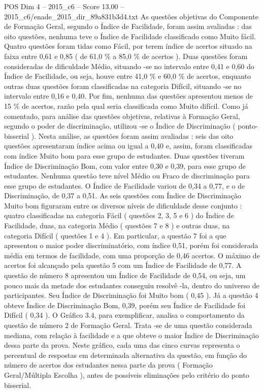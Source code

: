 \begin{textsample}{POS Dim 4 – 2015\_c6 – Score 13.00 – 2015\_c6/enade\_2015\_dir\_89a831b3d4.txt}
As questões objetivas do Componente de Formação Geral, segundo o Índice de Facilidade, foram assim avaliadas : das oito questões, nenhuma teve o Índice de Facilidade classificado como Muito fácil.
Quatro questões foram tidas como Fácil, por terem índice de acertos situado na faixa entre 0,61 e 0,85 ( de 61,0 \% a 85,0 \% de acertos ).
Duas questões foram consideradas de dificuldade Médio, situando -se no intervalo entre 0,41 e 0,60 do Índice de Facilidade, ou seja, houve entre 41,0 \% e 60,0 \% de acertos, enquanto outras duas questões foram classificadas na categoria Difícil, situando -se no intervalo entre 0,16 e 0,40.
Por fim, nenhuma das questões apresentou menos de 15 \% de acertos, razão pela qual seria classificada como Muito difícil.
Como já comentado, para análise das questões objetivas, relativas à Formação Geral, segundo o poder de discriminação, utilizou -se o Índice de Discriminação ( ponto- bisserial ).
Nesta análise, as questões foram assim avaliadas : seis das oito questões apresentaram índice acima ou igual a 0,40 e, assim, foram classificadas com índice Muito bom para esse grupo de estudantes.
Duas questões tiveram Índice de Discriminação Bom, com valor entre 0,30 e 0,39, para esse grupo de estudantes.
Nenhuma questão teve nível Médio ou Fraco de discriminação para esse grupo de estudantes.
O Índice de Facilidade variou de 0,34 a 0,77, e o de Discriminação, de 0,37 a 0,51.
As seis questões com Índice de Discriminação Muito bom figuraram entre os diversos níveis de dificuldade desse conjunto : quatro classificadas na categoria Fácil ( questões 2, 3, 5 e 6 ) do Índice de Facilidade, duas, na categoria Médio ( questões 7 e 8 ) e outras duas, na categoria Difícil ( questões 1 e 4 ).
Em particular, a questão 7 foi a que apresentou o maior poder discriminatório, com índice 0,51, porém foi considerada média em termos de facilidade, com uma proporção de 0,46 acertos.
O máximo de acertos foi alcançado pela questão 5 com um Índice de Facilidade de 0,77.
A questão de número 8 apresentou um Índice de Facilidade de 0,54, ou seja, um pouco mais da metade dos estudantes conseguiu resolvê -la, dentro do universo de participantes.
Seu Índice de Discriminação foi Muito bom ( 0,45 ).
Já a questão 4 obteve Índice de Discriminação Bom, 0,39, porém seu Índice de Facilidade foi Difícil ( 0,34 ).
O Gráfico 3.4, para exemplificar, analisa o comportamento da questão de número 2 de Formação Geral.
Trata -se de uma questão considerada mediana, com relação à facilidade e a que obteve o maior Índice de Discriminação dessa parte da prova.
Neste gráfico, cada uma das cinco curvas representa o percentual de respostas em determinada alternativa da questão, em função do número de acertos dos estudantes nessa parte da prova ( Formação Geral/Múltipla Escolha ), antes de possíveis eliminações pelo critério do ponto bisserial.

\end{textsample}
